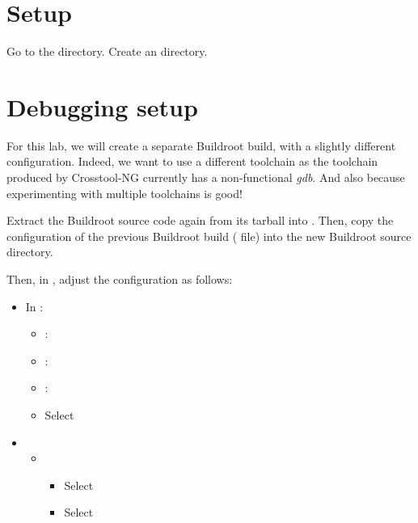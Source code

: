 
\section{Setup}

Go to the  directory.
Create an  directory.

\section{Debugging setup}

For this lab, we will create a separate Buildroot build, with a
slightly different configuration. Indeed, we want to use a different
toolchain as the toolchain produced by Crosstool-NG currently has a
non-functional {\em gdb}. And also because experimenting with multiple
toolchains is good!

Extract the Buildroot source code again from its tarball into
. Then, copy the
configuration of the previous Buildroot build ( file)
into the new Buildroot source directory.

Then, in , adjust the configuration as follows:

\begin{itemize}
\item In :
   \begin{itemize}
   \item {}: 
   \item {}: 
   \item {}: 
   \item Select 
   \end{itemize}
 \item {}
   \begin{itemize}
   \item {}
     \begin{itemize}
     \item Select 
     \item Select 
     \end{itemize}
   \end{itemize}
\end{itemize}

